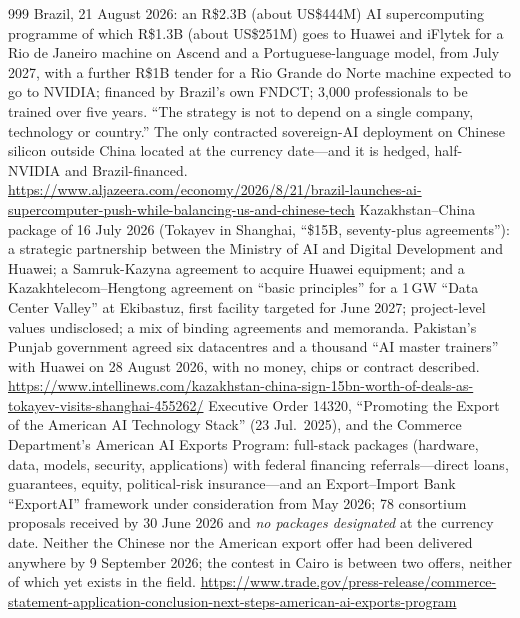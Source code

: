 \begin{thebibliography}{999}
 Brazil, 21 August 2026: an R\$2.3B (about US\$444M) AI supercomputing programme of which R\$1.3B (about US\$251M) goes to Huawei and iFlytek for a Rio de Janeiro machine on Ascend and a Portuguese-language model, from July 2027, with a further R\$1B tender for a Rio Grande do Norte machine expected to go to NVIDIA; financed by Brazil's own FNDCT; 3{,}000 professionals to be trained over five years. ``The strategy is not to depend on a single company, technology or country.'' The only contracted sovereign-AI deployment on Chinese silicon outside China located at the currency date---and it is hedged, half-NVIDIA and Brazil-financed. \url{https://www.aljazeera.com/economy/2026/8/21/brazil-launches-ai-supercomputer-push-while-balancing-us-and-chinese-tech}
 Kazakhstan--China package of 16 July 2026 (Tokayev in Shanghai, ``\$15B, seventy-plus agreements''): a strategic partnership between the Ministry of AI and Digital Development and Huawei; a Samruk-Kazyna agreement to acquire Huawei equipment; and a Kazakhtelecom--Hengtong agreement on ``basic principles'' for a 1\,GW ``Data Center Valley'' at Ekibastuz, first facility targeted for June 2027; project-level values undisclosed; a mix of binding agreements and memoranda. Pakistan's Punjab government agreed six datacentres and a thousand ``AI master trainers'' with Huawei on 28 August 2026, with no money, chips or contract described. \url{https://www.intellinews.com/kazakhstan-china-sign-15bn-worth-of-deals-as-tokayev-visits-shanghai-455262/}
 Executive Order 14320, ``Promoting the Export of the American AI Technology Stack'' (23 Jul.\ 2025), and the Commerce Department's American AI Exports Program: full-stack packages (hardware, data, models, security, applications) with federal financing referrals---direct loans, guarantees, equity, political-risk insurance---and an Export--Import Bank ``ExportAI'' framework under consideration from May 2026; 78 consortium proposals received by 30 June 2026 and \emph{no packages designated} at the currency date. Neither the Chinese nor the American export offer had been delivered anywhere by 9 September 2026; the contest in Cairo is between two offers, neither of which yet exists in the field. \url{https://www.trade.gov/press-release/commerce-statement-application-conclusion-next-steps-american-ai-exports-program}

\end{thebibliography}
